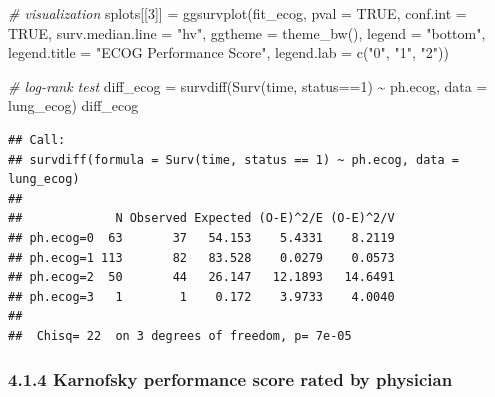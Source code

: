 \documentclass[
]{article}
\newenvironment{Shaded}{\begin{snugshade}}{\end{snugshade}}
\newcommand{\AttributeTok}[1]{\textcolor[rgb]{0.77,0.63,0.00}{#1}}
\newcommand{\CommentTok}[1]{\textcolor[rgb]{0.56,0.35,0.01}{\textit{#1}}}
\newcommand{\ConstantTok}[1]{\textcolor[rgb]{0.00,0.00,0.00}{#1}}
\newcommand{\DecValTok}[1]{\textcolor[rgb]{0.00,0.00,0.81}{#1}}
\newcommand{\FunctionTok}[1]{\textcolor[rgb]{0.00,0.00,0.00}{#1}}
\newcommand{\NormalTok}[1]{#1}
\newcommand{\OtherTok}[1]{\textcolor[rgb]{0.56,0.35,0.01}{#1}}
\newcommand{\SpecialCharTok}[1]{\textcolor[rgb]{0.00,0.00,0.00}{#1}}
\newcommand{\StringTok}[1]{\textcolor[rgb]{0.31,0.60,0.02}{#1}}
\begin{document}
\begin{Shaded}
\begin{Highlighting}[]
\CommentTok{\# visualization}
\NormalTok{splots[[}\DecValTok{3}\NormalTok{]] }\OtherTok{=} \FunctionTok{ggsurvplot}\NormalTok{(fit\_ecog,}
                         \AttributeTok{pval =} \ConstantTok{TRUE}\NormalTok{, }\AttributeTok{conf.int =} \ConstantTok{TRUE}\NormalTok{,}
                         \AttributeTok{surv.median.line =} \StringTok{"hv"}\NormalTok{, }
                         \AttributeTok{ggtheme =} \FunctionTok{theme\_bw}\NormalTok{(), }
                         \AttributeTok{legend =} \StringTok{"bottom"}\NormalTok{, }
                         \AttributeTok{legend.title =} \StringTok{"ECOG Performance Score"}\NormalTok{,}
                         \AttributeTok{legend.lab =} \FunctionTok{c}\NormalTok{(}\StringTok{"0"}\NormalTok{, }\StringTok{"1"}\NormalTok{, }\StringTok{"2"}\NormalTok{))}

\CommentTok{\# log{-}rank test}
\NormalTok{diff\_ecog }\OtherTok{=} \FunctionTok{survdiff}\NormalTok{(}\FunctionTok{Surv}\NormalTok{(time, status}\SpecialCharTok{==}\DecValTok{1}\NormalTok{) }\SpecialCharTok{\textasciitilde{}}\NormalTok{ ph.ecog, }\AttributeTok{data =}\NormalTok{ lung\_ecog) }
\NormalTok{diff\_ecog}
\end{Highlighting}
\end{Shaded}

\begin{verbatim}
## Call:
## survdiff(formula = Surv(time, status == 1) ~ ph.ecog, data = lung_ecog)
## 
##             N Observed Expected (O-E)^2/E (O-E)^2/V
## ph.ecog=0  63       37   54.153    5.4331    8.2119
## ph.ecog=1 113       82   83.528    0.0279    0.0573
## ph.ecog=2  50       44   26.147   12.1893   14.6491
## ph.ecog=3   1        1    0.172    3.9733    4.0040
## 
##  Chisq= 22  on 3 degrees of freedom, p= 7e-05
\end{verbatim}

\hypertarget{karnofsky-performance-score-rated-by-physician}{%
\subsubsection{4.1.4 Karnofsky performance score rated by
physician}\label{karnofsky-performance-score-rated-by-physician}}
\end{document}
